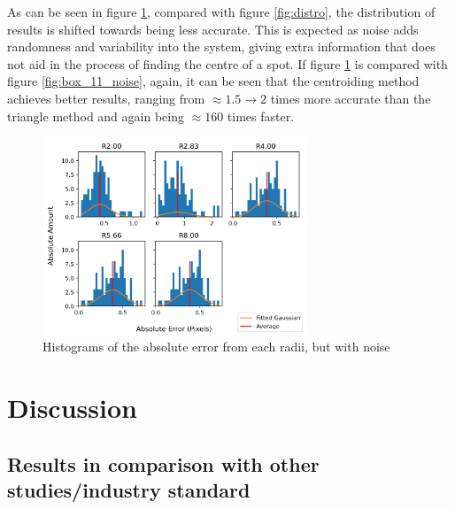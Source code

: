 \documentclass[aps,pra,a4paper,nofootinbib,onecolumn,tightenlines,longbibliography,12pt,amsfonts,amssymb,amsmath,floatfix]{revtex4-2} %
\begin{document}
  As can be seen in figure \ref{fig:distro_noise}, compared with figure \ref{fig:distro}, the distribution
  of results is shifted towards being less accurate. This is expected as noise adds randomness and 
  variability into the system, giving extra information that does not aid in the process of finding the 
  centre of a spot. If figure \ref{fig:distro_noise} is compared with figure \ref{fig:box_11_noise}, again, 
  it can be seen that the centroiding method achieves better results, ranging from $\approx 1.5\rightarrow 2$
  times more accurate than the triangle method and again being $\approx 160$ times faster.

  \begin{figure}[H]
    \begin{center}
      \includegraphics[width=0.7\textwidth]{project_pics/distro_noise.png}
    \end{center}
    \caption{Histograms of the absolute error from each radii, but with noise}
    \label{fig:distro_noise}
  \end{figure}


\section{Discussion} %
\label{sec:Discussion}


  \subsection{Results in comparison with other studies/industry standard} %
  \label{sub:Results in comparison with other studies/industry standard}
  
\end{document}
